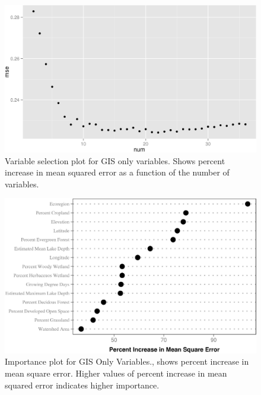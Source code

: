 \documentclass[11pt,]{article}
\begin{document}
\begin{figure}[htbp]
\centering
\includegraphics{manuscript_files/figure-latex/gis_var_sel_figure-1.jpeg}
\caption{Variable selection plot for GIS only variables. Shows percent
increase in mean squared error as a function of the number of variables.
\label{fig:gis_varsel_figure}}
\end{figure}

\newpage

\begin{figure}[htbp]
\centering
\includegraphics{manuscript_files/figure-latex/GIS_Importance-1.jpeg}
\caption{Importance plot for GIS Only Variables., shows percent increase
in mean square error. Higher values of percent increase in mean squared
error indicates higher importance. \label{fig:GIS_Importance}}
\end{figure}

\newpage

\newpage

\newpage

\newpage
\end{document}
